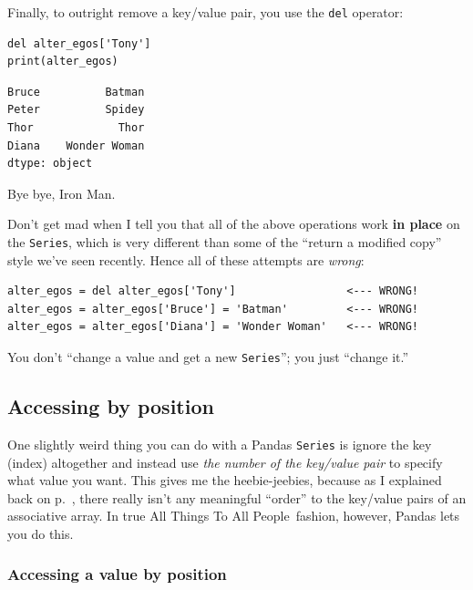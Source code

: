 \label{delOp}

Finally, to outright remove a key/value pair, you use the \texttt{del}
operator:

\begin{Verbatim}[fontsize=\small,samepage=true,frame=single,framesep=3mm]
del alter_egos['Tony']
print(alter_egos)
\end{Verbatim}

\begin{Verbatim}[fontsize=\small,samepage=true,frame=leftline,framesep=5mm,framerule=1mm]
Bruce          Batman
Peter          Spidey
Thor             Thor
Diana    Wonder Woman
dtype: object
\end{Verbatim}

Bye bye, Iron Man.
\medskip


Don't get mad when I tell you that all of the above operations work
\textbf{in place} on the \texttt{Series}, which is very different than some of
the ``return a modified copy'' style we've seen recently. Hence all of these
attempts are \textit{wrong}:

\begin{Verbatim}[fontsize=\footnotesize,samepage=true,frame=single,framesep=3mm]
alter_egos = del alter_egos['Tony']                 <--- WRONG!
alter_egos = alter_egos['Bruce'] = 'Batman'         <--- WRONG!
alter_egos = alter_egos['Diana'] = 'Wonder Woman'   <--- WRONG!
\end{Verbatim}

You don't ``change a value and get a new \texttt{Series}''; you just
``change it.''

\subsection{Accessing by position}


One slightly weird thing you can do with a Pandas \texttt{Series} is ignore the
key (index) altogether and instead use \textit{the number of the key/value
pair} to specify what value you want. This gives me the heebie-jeebies, because
as I explained back on p.~\pageref{assocArraysUnordered}, there really isn't
any meaningful ``order'' to the key/value pairs of an associative array. In
true All Things To All People\texttrademark~fashion, however, Pandas lets you
do this.

\subsubsection{Accessing a value by position}

